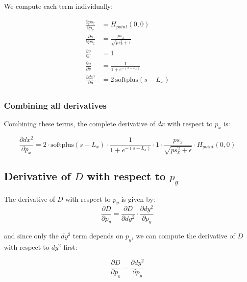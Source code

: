 \documentclass[11pt]{article}
\begin{document}
            We compute each term individually:

            \begin{align}
                \frac{\partial ps_{x}}{\partial p_x} &= H_{point}(0,0) \\
                \frac{\partial s}{\partial ps_{x}} &= \frac{ps_{x}}{\sqrt{ps_{x}^2 + \epsilon}}\\
                \frac{\partial v}{\partial s} &= 1\\
                \frac{\partial u}{\partial v} &= \frac{1}{1 + e^{-(s - L_x)}}\\
                \frac{\partial dx^2}{\partial u} &= 2\,\text{softplus}(s - L_x)\\
            \end{align}

           \subsubsection*{Combining all derivatives}
            
                Combining these terms, the complete derivative of \(dx\) with respect to \(p_x\) is:

                \begin{equation}
                    \frac{\partial dx^2}{\partial p_x}
                    = 2 \cdot \text{softplus}(s - L_x)
                    \cdot \frac{1}{1 + e^{-(s - L_x)}}
                    \cdot 1
                    \cdot \frac{ps_{x}}{\sqrt{ps_{x}^2 + \epsilon}}
                    \cdot H_{point}(0,0)
                \end{equation}

        \subsection*{Derivative of $D$ with respect to $p_y$}

            The derivative of \(D\) with respect to \(p_y\) is given by:
            \begin{equation}
                \frac{\partial D}{\partial p_y} = \frac{\partial D}{\partial dy^2} \cdot \frac{\partial dy^2}{\partial p_y}
            \end{equation}
            
            and since only the \(dy^2\) term depends on \(p_y\), we can compute the derivative of \(D\) with respect to \(dy^2\) first:
            
            \begin{equation}
                \frac{\partial D}{\partial p_y} = \frac{\partial dy^2}{\partial p_y}
            \end{equation}
            
\end{document}
